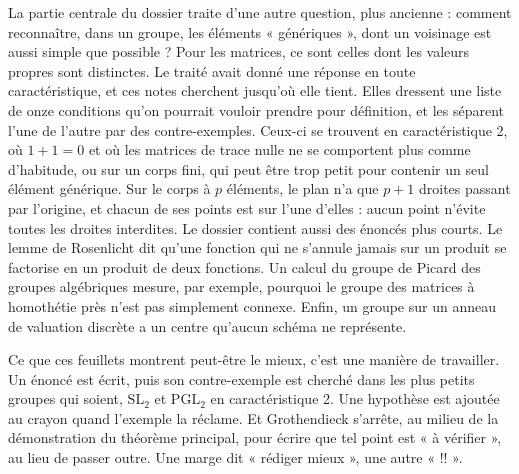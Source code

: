 \documentclass[11pt,a4paper]{article}
\begin{document}
\begin{resume}
La partie centrale du dossier traite d'une autre question, plus ancienne :
comment reconnaître, dans un groupe, les éléments « génériques », dont un
voisinage est aussi simple que possible ? Pour les matrices, ce sont celles
dont les valeurs propres sont distinctes. Le traité avait donné une réponse en
toute caractéristique, et ces notes cherchent jusqu'où elle tient. Elles
dressent une liste de onze conditions qu'on pourrait vouloir prendre pour
définition, et les séparent l'une de l'autre par des contre-exemples. Ceux-ci
se trouvent en caractéristique 2, où $1 + 1 = 0$ et où les matrices de trace
nulle ne se comportent plus comme d'habitude, ou sur un corps fini, qui peut
être trop petit pour contenir un seul élément générique. Sur le corps à $p$
éléments, le plan n'a que $p+1$ droites passant par l'origine, et chacun de
ses points est sur l'une d'elles : aucun point n'évite toutes les droites
interdites. Le dossier contient aussi des énoncés plus courts. Le lemme de
Rosenlicht dit qu'une fonction qui ne s'annule jamais sur un produit se
factorise en un produit de deux fonctions. Un calcul du groupe de Picard des
groupes algébriques mesure, par exemple, pourquoi le groupe des matrices à
homothétie près n'est pas simplement connexe. Enfin, un groupe sur un anneau
de valuation discrète a un centre qu'aucun schéma ne représente.

Ce que ces feuillets montrent peut-être le mieux, c'est une manière de
travailler. Un énoncé est écrit, puis son contre-exemple est cherché dans les
plus petits groupes qui soient, $\mathrm{SL}_{2}$ et $\mathrm{PGL}_{2}$ en
caractéristique 2. Une hypothèse est ajoutée au crayon quand l'exemple la
réclame. Et Grothendieck s'arrête, au milieu de la démonstration du théorème
principal, pour écrire que tel point est « à vérifier », au lieu de passer
outre. Une marge dit « rédiger mieux », une autre « !! ».

\end{resume}
\end{document}
